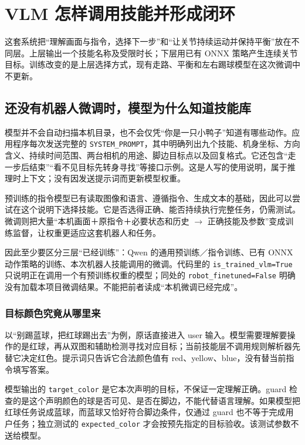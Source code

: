 \chapter{VLM 怎样调用技能并形成闭环}
\label{chap:runtime}

这套系统把“理解画面与指令，选择下一步”和“让关节持续运动并保持平衡”放在不同层。上层输出一个技能名称及受限时长；下层用已有 ONNX 策略产生连续关节目标。训练改变的是上层选择方式，现有走路、平衡和左右踢球模型在这次微调中不更新。

\section{还没有机器人微调时，模型为什么知道技能库}

模型并不会自动扫描本机目录，也不会仅凭“你是一只小鸭子”知道有哪些动作。应用程序每次发送完整的 \texttt{SYSTEM\_PROMPT}，其中明确列出九个技能、机身坐标、方向含义、持续时间范围、两台相机的用途、脚边目标点以及回复格式。它还包含“走一步后结束”“看不见目标先转身寻找”等接口示例。这是人写的使用说明，属于推理时上下文；没有因发送提示词而更新模型权重。

预训练的指令模型已有读取图像和语言、遵循指令、生成文本的基础，因此可以尝试在这个说明下选择技能。它是否选得正确、能否持续执行完整任务，仍需测试。微调则把大量“本机画面＋原指令＋必要状态和历史 $\rightarrow$ 正确技能及参数”变成训练监督，让权重更适应这套机器人和任务。

因此至少要区分三层“已经训练”：Qwen 的通用预训练／指令训练、已有 ONNX 动作策略的训练、本次机器人技能调用的微调。代码里的 \texttt{is\_trained\_vlm=True} 只说明正在调用一个有预训练权重的模型；同处的 \texttt{robot\_finetuned=False} 明确没有加载本项目微调结果。不能把前者读成“本机微调已经完成”。

\subsection{目标颜色究竟从哪里来}

以“别踢蓝球，把红球踢出去”为例，原话直接进入 user 输入。模型需要理解要操作的是红球，再从双图和辅助检测寻找对应目标；当前技能层不调用规则解析器先替它决定红色。提示词只告诉它合法颜色值有 red、yellow、blue，没有替当前指令填写答案。

模型输出的 \texttt{target\_color} 是它本次声明的目标，不保证一定理解正确。guard 检查的是这个声明颜色的球是否可见、是否在脚边，不能代替语言理解。如果模型把红球任务说成蓝球，而蓝球又恰好符合脚边条件，仅通过 guard 也不等于完成用户任务；独立测试的 \texttt{expected\_color} 才会按预先指定的目标验收。该测试参数不送给模型。

